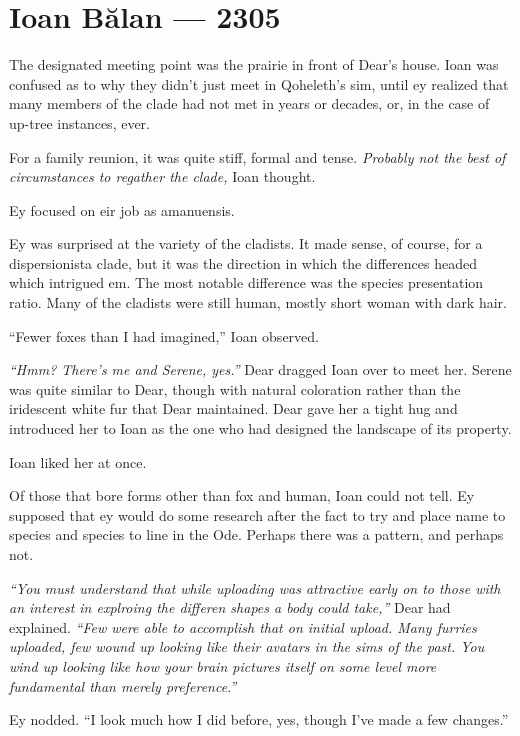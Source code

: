 \hypertarget{ioan-bux103lan-2305}{%
\chapter*{Ioan Bălan — 2305}\label{ioan-bux103lan-2305}}

The designated meeting point was the prairie in front of Dear's house. Ioan was confused as to why they didn't just meet in Qoheleth's sim, until ey realized that many members of the clade had not met in years or decades, or, in the case of up-tree instances, ever.

For a family reunion, it was quite stiff, formal and tense. \emph{Probably not the best of circumstances to regather the clade,} Ioan thought.

Ey focused on eir job as amanuensis.

Ey was surprised at the variety of the cladists. It made sense, of course, for a dispersionista clade, but it was the direction in which the differences headed which intrigued em. The most notable difference was the species presentation ratio. Many of the cladists were still human, mostly short woman with dark hair.

``Fewer foxes than I had imagined,'' Ioan observed.

\emph{``Hmm? There's me and Serene, yes.''} Dear dragged Ioan over to meet her. Serene was quite similar to Dear, though with natural coloration rather than the iridescent white fur that Dear maintained. Dear gave her a tight hug and introduced her to Ioan as the one who had designed the landscape of its property.

Ioan liked her at once.

Of those that bore forms other than fox and human, Ioan could not tell. Ey supposed that ey would do some research after the fact to try and place name to species and species to line in the Ode. Perhaps there was a pattern, and perhaps not.

\emph{``You must understand that while uploading was attractive early on to those with an interest in explroing the differen shapes a body could take,''} Dear had explained. \emph{``Few were able to accomplish that on initial upload. Many furries uploaded, few wound up looking like their avatars in the sims of the past. You wind up looking like how your brain pictures itself on some level more fundamental than merely preference.''}

Ey nodded. ``I look much how I did before, yes, though I've made a few changes.''

